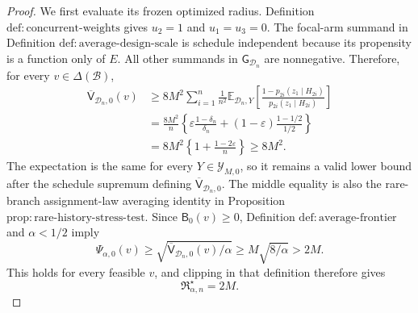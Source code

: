 \documentclass{article}
\begin{document}
\begin{proof}
We first evaluate its frozen optimized radius.  Definition \(\mathrm{def:concurrent\text{-}weights}\) gives \(u_2=1\) and \(u_1=u_3=0\).  The focal-arm summand in Definition \(\mathrm{def:average\text{-}design\text{-}scale}\) is schedule independent because its propensity is a function only of \(E\).  All other summands in \(\mathsf G_{\mathcal D_n}\) are nonnegative.  Therefore, for every \(v\in\Delta(\mathcal B)\),
\[
\begin{aligned}
 \overline{\mathsf V}_{\mathcal D_n,0}(v)
 &\ge
 8M^2\sum_{i=1}^{n}\frac{1}{n^2}
 \mathbb E_{\mathcal D_n,Y}
 \left[
  \frac{1-p_{2i}(z_1\mid H_{2i})}
       {p_{2i}(z_1\mid H_{2i})}
 \right]\\
 &=\frac{8M^2}{n}
 \left\{
  \varepsilon\frac{1-\delta_n}{\delta_n}
  +(1-\varepsilon)\frac{1-1/2}{1/2}
 \right\}\\
 &=8M^2\left\{1+\frac{1-2\varepsilon}{n}\right\}
 \ge 8M^2.
\end{aligned}
\]
The expectation is the same for every \(Y\in\mathcal Y_{M,0}\), so it remains a valid lower bound after the schedule supremum defining \(\overline{\mathsf V}_{\mathcal D_n,0}\).  The middle equality is also the rare-branch assignment-law averaging identity in Proposition \(\mathrm{prop:rare\text{-}history\text{-}stress\text{-}test}\).  Since \(\mathsf B_0(v)\ge0\), Definition \(\mathrm{def:average\text{-}frontier}\) and \(\alpha<1/2\) imply
\[
 \Psi_{\alpha,0}(v)
 \ge \sqrt{\overline{\mathsf V}_{\mathcal D_n,0}(v)/\alpha}
 \ge M\sqrt{8/\alpha}>2M.
\]
This holds for every feasible \(v\), and clipping in that definition therefore gives
\[
 \mathfrak R_{\alpha,n}^\star=2M.
\]


\end{proof}
\end{document}
